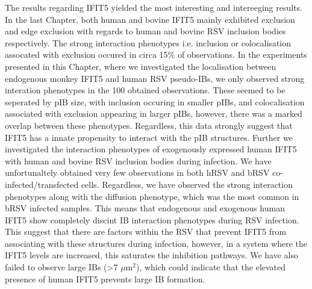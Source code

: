 The results regarding IFIT5 yielded the most interesting and intereeging results. In the last Chapter, both human and bovine IFIT5 mainly exhibited exclusion and edge exclusion with regards to human and bovine RSV inclusion bodies respectively. The strong interaction phenotypes i.e. inclusion or colocalisation assocated with exclusion occured in circa 15\% of observations. In the experiments presented in this Chapter, where we investigated the localisation between endogenous monkey IFIT5 and human RSV pseudo-IBs, we only observed strong interation phenotypes in the 100 obtained observations. These seemed to be seperated by pIB size, with inclusion occuring in smaller pIBs, and colocalisation associated with exclusion appearing in larger pIBs, however, there was a marked overlap between these phenotypes. Regardless, this data strongly suggest that IFIT5 has a innate propensity to interact with the pIB structures. Further we investigated the interaction phenotypes of exogenously expressed human IFIT5 with human and bovine RSV inclusion bodies during infection. We have unfortunaltely obtained very few observations in both hRSV and bRSV co-infected/transfected cells. Regardless, we have observed the strong interaction phenotypes along with the diffusion phenotype, which was the most common in bRSV infected samples. This means that endogenous and exogenous human IFIT5 show completely discint IB interaction phenotypes during RSV infection. This suggest that there are factors within the RSV that prevent IFIT5 from associating with these structures during infection, however, in a system where the IFIT5 levels are increased, this saturates the inhibition pathways. We have also failed to observe large IBs (>7 \(\mu \mbox{m}^2\)), which could indicate that the elevated presence of human IFIT5 prevents large IB formation. 

